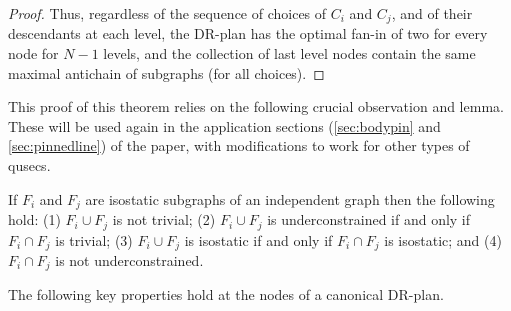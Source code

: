 \begin{proof}
    Thus, regardless of the sequence of choices of $C_i$ and $C_j$, and of their descendants at each level, the DR-plan has the optimal fan-in of two for every node for $N-1$ levels, and the collection of last level nodes contain the same maximal antichain of subgraphs (for all choices).
\end{proof}

This proof of this theorem relies on the following crucial observation and lemma. These will be used again in the application sections (\ref{sec:bodypin} and \ref{sec:pinnedline}) of the paper, with modifications to work for other types of qusecs.

\begin{observation*}
\label{lemma:union_intersection}
    If $F_i$ and $F_j$ are isostatic subgraphs of an independent graph then the following hold:
    (1) $F_i\cup F_j$ is not trivial;
    (2) $F_i\cup F_j$ is underconstrained if and only if $F_i\cap F_j$ is trivial;
    (3) $F_i\cup F_j$ is isostatic if and only if $F_i\cap F_j$ is isostatic; and
    (4) $F_i\cap F_j$ is not underconstrained.
\end{observation*}

The following key properties hold at the nodes of a canonical DR-plan.

